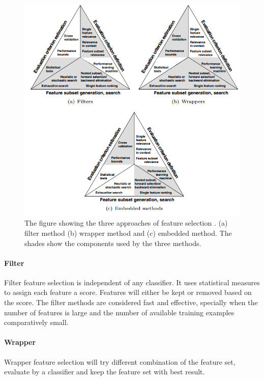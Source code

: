 \documentclass[USenglish]{ifimaster}  %
\begin{document}
	
	\begin{figure}[h]
		\centering
		\includegraphics[scale=0.7]{Figures/FilterWrapperEmbedded.PNG}
		\caption{The figure showing the three approaches of feature selection \cite{Guyon2006}. (a) filter method (b) wrapper method and (c) embedded method.  The shades show the components used by the three methods.}
		\label{fig:selection}
	\end{figure}
	
	
	\paragraph{Filter}
	Filter feature selection is independent of any classifier. It uses statistical measures to assign each feature a score. Features will either be kept or removed based on the score. The filter methods are considered fast and effective, specially when the number of features is large and the number of available training examples comparatively small.  
	
	
	\paragraph{Wrapper}
	Wrapper feature selection will try different combination of the feature set, evaluate by a classifier and keep the feature set with best result.
	
\end{document}
